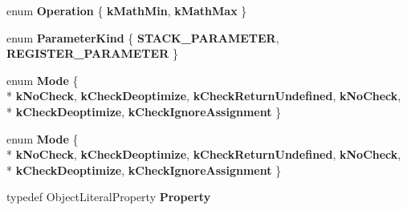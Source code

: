 \begin{DoxyCompactItemize}
\item 
\hypertarget{classv8_1_1internal_1_1_v8___f_i_n_a_l_a7077135d1515edf48cb619936c1bb19c}{}enum {\bfseries Operation} \{ {\bfseries k\+Math\+Min}, 
{\bfseries k\+Math\+Max}
 \}\label{classv8_1_1internal_1_1_v8___f_i_n_a_l_a7077135d1515edf48cb619936c1bb19c}

\item 
\hypertarget{classv8_1_1internal_1_1_v8___f_i_n_a_l_a19b074809628a293c7858b253266bcb6}{}enum {\bfseries Parameter\+Kind} \{ {\bfseries S\+T\+A\+C\+K\+\_\+\+P\+A\+R\+A\+M\+E\+T\+E\+R}, 
{\bfseries R\+E\+G\+I\+S\+T\+E\+R\+\_\+\+P\+A\+R\+A\+M\+E\+T\+E\+R}
 \}\label{classv8_1_1internal_1_1_v8___f_i_n_a_l_a19b074809628a293c7858b253266bcb6}

\item 
\hypertarget{classv8_1_1internal_1_1_v8___f_i_n_a_l_a37a207796e189e3305870b81e93ab81e}{}enum {\bfseries Mode} \{ \\*
{\bfseries k\+No\+Check}, 
{\bfseries k\+Check\+Deoptimize}, 
{\bfseries k\+Check\+Return\+Undefined}, 
{\bfseries k\+No\+Check}, 
\\*
{\bfseries k\+Check\+Deoptimize}, 
{\bfseries k\+Check\+Ignore\+Assignment}
 \}\label{classv8_1_1internal_1_1_v8___f_i_n_a_l_a37a207796e189e3305870b81e93ab81e}

\item 
\hypertarget{classv8_1_1internal_1_1_v8___f_i_n_a_l_a37a207796e189e3305870b81e93ab81e}{}enum {\bfseries Mode} \{ \\*
{\bfseries k\+No\+Check}, 
{\bfseries k\+Check\+Deoptimize}, 
{\bfseries k\+Check\+Return\+Undefined}, 
{\bfseries k\+No\+Check}, 
\\*
{\bfseries k\+Check\+Deoptimize}, 
{\bfseries k\+Check\+Ignore\+Assignment}
 \}\label{classv8_1_1internal_1_1_v8___f_i_n_a_l_a37a207796e189e3305870b81e93ab81e}

\item 
\hypertarget{classv8_1_1internal_1_1_v8___f_i_n_a_l_ae71796052348577e38a5d131d780a850}{}typedef Object\+Literal\+Property {\bfseries Property}\label{classv8_1_1internal_1_1_v8___f_i_n_a_l_ae71796052348577e38a5d131d780a850}

\end{DoxyCompactItemize}
